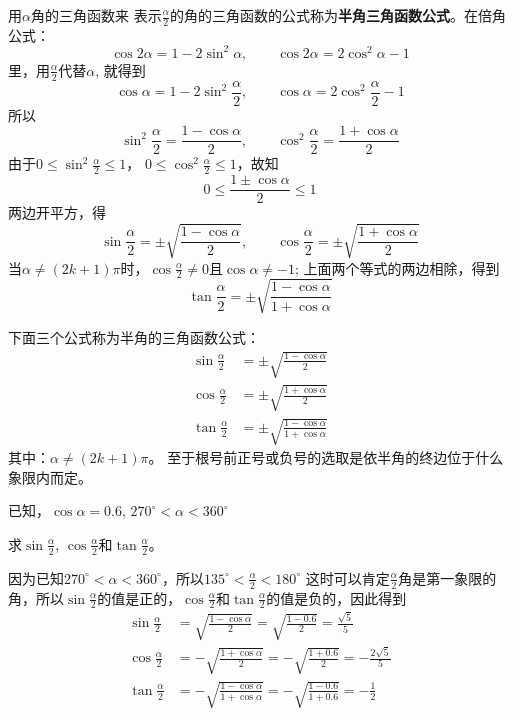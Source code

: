 用$\alpha$角的三角函数来
表示$\frac{\alpha}{2}$的角的三角函数的公式称为\textbf{半角三角函数公式}。在倍角公式：
\[\cos2\alpha=1-2\sin^2\alpha,\qquad \cos2\alpha=2\cos^2\alpha-1\]
里，用$\frac{\alpha}{2}$代替$\alpha$, 就得到
\[\cos\alpha=1-2\sin^2\frac{\alpha}{2},\qquad \cos\alpha=2\cos^2\frac{\alpha}{2}-1\]
所以
\[\sin^2\frac{\alpha}{2}=\frac{1-\cos\alpha}{2},\qquad \cos^2\frac{\alpha}{2}=\frac{1+\cos\alpha}{2}\]
由于$0\le \sin^2 \frac{\alpha}{2}\le 1$，
$0\le \cos^2\frac{\alpha}{2}\le 1$，故知
\[0\le \frac{1\pm\cos\alpha}{2}\le 1\]
两边开平方，得
\[\sin\frac{\alpha}{2}=\pm\sqrt{\frac{1-\cos\alpha}{2}},\qquad \cos\frac{\alpha}{2}=\pm\sqrt{\frac{1+\cos\alpha}{2}}\]
当$\alpha\ne(2k+1)\pi$时，$\cos\frac{\alpha}{2}\ne 0$且$\cos\alpha\ne -1$; 上面两个等式的两边相除，得到
\[\tan\frac{\alpha}{2}=\pm\sqrt{\frac{1-\cos\alpha}{1+\cos\alpha}}\]

下面三个公式称为半角的三角函数公式：
\begin{align}
    \sin\frac{\alpha}{2}&=\pm\sqrt{\frac{1-\cos\alpha}{2}}\\
     \cos\frac{\alpha}{2}&=\pm\sqrt{\frac{1+\cos\alpha}{2}}\\
     \tan\frac{\alpha}{2}&=\pm\sqrt{\frac{1-\cos\alpha}{1+\cos\alpha}}
\end{align}
其中：$\alpha\ne (2k+1)\pi$。
至于根号前正号或负号的选取是依半角的终边位于什么象限内而定。

\begin{example}
已知，$\cos\alpha=0.6$, $270^{\circ}<\alpha<360^{\circ}$

求$\sin \frac{\alpha}{2}$, $\cos\frac{\alpha}{2}$和$\tan \frac{\alpha}{2}$。
\end{example}

\begin{solution}
因为已知$270^{\circ}<\alpha<360^{\circ}$，所以$135^{\circ}<\frac{\alpha}{2}<180^{\circ}$
这时可以肯定$\frac{\alpha}{2}$角是第一象限的角，所以$\sin \frac{\alpha}{2}$的值是正的，$\cos\frac{\alpha}{2}$和$\tan \frac{\alpha}{2}$的值是负的，因此得到
\[\begin{split}
    \sin\frac{\alpha}{2}&=\sqrt{\frac{1-\cos\alpha}{2}}=\sqrt{\frac{1-0.6}{2}}=\frac{\sqrt{5}}{5}\\
     \cos\frac{\alpha}{2}&=-\sqrt{\frac{1+\cos\alpha}{2}}=-\sqrt{\frac{1+0.6}{2}}=-\frac{2\sqrt{5}}{5}\\
     \tan\frac{\alpha}{2}&=-\sqrt{\frac{1-\cos\alpha}{1+\cos\alpha}}=-\sqrt{\frac{1-0.6}{1+0.6}}=-\frac{1}{2}
\end{split}\]
\end{solution}

